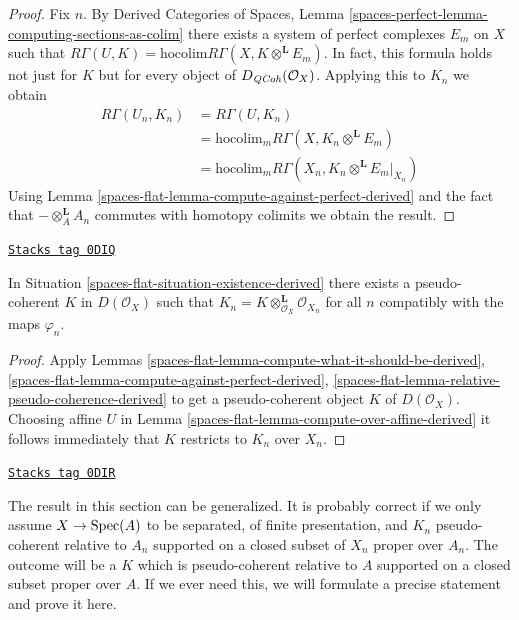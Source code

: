 \begin{proof}
Fix $n$. By Derived Categories of Spaces, Lemma
\ref{spaces-perfect-lemma-computing-sections-as-colim}
there exists a system of perfect complexes $E_m$
on $X$ such that
$R\Gamma(U, K) = \text{hocolim} R\Gamma(X, K \otimes^\mathbf{L} E_m)$.
In fact, this formula holds not just for $K$ but for every object of
$D_{\mathit{QCoh}}(\mathcal{O}_X)$.
Applying this to $K_n$
we obtain
\begin{align*}
R\Gamma(U_n, K_n)
& =
R\Gamma(U, K_n) \\
& =
\text{hocolim}_m R\Gamma(X, K_n \otimes^\mathbf{L} E_m) \\
& =
\text{hocolim}_m R\Gamma(X_n, K_n \otimes^\mathbf{L} E_m|_{X_n})
\end{align*}
Using Lemma \ref{spaces-flat-lemma-compute-against-perfect-derived}
and the fact that $- \otimes_A^\mathbf{L} A_n$
commutes with homotopy colimits we obtain the result.
\end{proof}

\begin{theorem}

\label{spaces-flat-theorem-existence-derived}
\href{https://stacks.math.columbia.edu/tag/0DIQ}{\texttt{Stacks tag 0DIQ}}

In Situation \ref{spaces-flat-situation-existence-derived}
there exists a pseudo-coherent $K$ in $D(\mathcal{O}_X)$
such that $K_n = K \otimes_{\mathcal{O}_X}^\mathbf{L} \mathcal{O}_{X_n}$
for all $n$ compatibly with the maps $\varphi_n$.
\end{theorem}

\begin{proof}
Apply Lemmas \ref{spaces-flat-lemma-compute-what-it-should-be-derived},
\ref{spaces-flat-lemma-compute-against-perfect-derived},
\ref{spaces-flat-lemma-relative-pseudo-coherence-derived}
to get a pseudo-coherent object $K$ of $D(\mathcal{O}_X)$.
Choosing affine $U$ in Lemma
\ref{spaces-flat-lemma-compute-over-affine-derived}
it follows immediately that $K$ restricts to $K_n$ over $X_n$.
\end{proof}

\begin{remark}
\label{spaces-flat-remark-correct-generality}
\href{https://stacks.math.columbia.edu/tag/0DIR}{\texttt{Stacks tag 0DIR}}

The result in this section can be generalized. It is probably correct
if we only assume $X \to \operatorname{Spec}(A)$ to be separated, of finite presentation,
and $K_n$ pseudo-coherent relative to $A_n$ supported on a closed
subset of $X_n$ proper over $A_n$. The outcome will be a $K$ which
is pseudo-coherent relative to $A$ supported on a closed subset
proper over $A$. If we ever need this, we will
formulate a precise statement and prove it here.
\end{remark}



